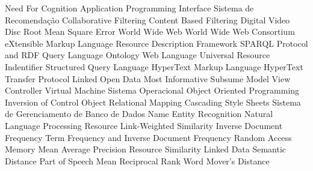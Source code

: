 \begin{acronym}[ACRONYM] 

 {Need For Cognition}
 {Application Programming Interface}
 {Sistema de Recomendação}
 {Collaborative Filtering}
 {Content Based Filtering}
 {Digital Video Disc}
 {Root Mean Square Error}
 {World Wide Web}
 {World Wide Web Consortium}
 {eXtensible Markup Language}
 {Resource Description Framework}
 {SPARQL Protocol and RDF Query Language}
 {Ontology Web Language}
 {Universal Resource Indentifier}
 {Structured Query Language}
 {HyperText Markup Language}
 {HyperText Transfer Protocol}
 {Linked Open Data}
 {Most Informative Subsume}
 {Model View Controller}
 {Virtual Machine}
 {Sistema Operacional}
 {Object Oriented Programming}
 {Inversion of Control}
 {Object Relational Mapping}
 {Cascading Style Sheets}
 {Sistema de Gerenciamento de Banco de Dados}
 {Name Entity Recognition}
 {Natural Language Processing}
 {Resource Link-Weighted Similarity}
 {Inverse Document Frequency}
 {Term Frequency and Inverse Document Frequency}
 {Random Access Memory}
 {Mean Average Precision}
 {Resource Similarity}
 {Linked Data Semantic Distance}
 {Part of Speech}
 {Mean Reciprocal Rank}
 {Word Mover's Distance}    
\end{acronym}